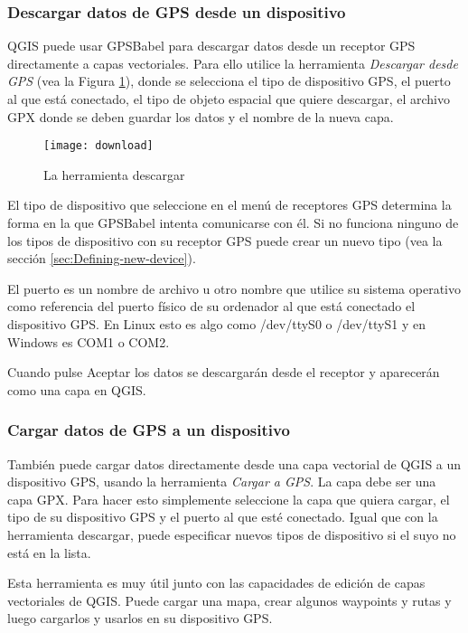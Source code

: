 \subsubsection{Descargar datos de GPS desde un dispositivo}

QGIS puede usar GPSBabel para descargar datos desde un receptor GPS
directamente a capas vectoriales. Para ello utilice la herramienta \emph{Descargar desde GPS} (vea la Figura \ref{figure_download}), donde se selecciona el tipo de dispositivo GPS, el puerto al que está conectado, 
el tipo de objeto espacial que quiere descargar, el archivo GPX donde se deben
guardar los datos y el nombre de la nueva capa.

\begin{figure}[ht]
   \begin{center}
\caption{\label{figure_download}La herramienta descargar}
\texttt{[image: download]}
   \end{center}
\end{figure}


El tipo de dispositivo que seleccione en el menú de receptores GPS determina la forma en la que GPSBabel
intenta comunicarse con él. Si no funciona ninguno de los tipos de dispositivo con su receptor GPS puede crear un nuevo tipo (vea la sección
\ref{sec:Defining-new-device}).

El puerto es un nombre de archivo u otro nombre que utilice su sistema operativo
como referencia del puerto físico de su ordenador al que
está conectado el dispositivo GPS. En Linux esto es algo como /dev/ttyS0
o /dev/ttyS1 y en Windows es COM1 o COM2.

Cuando pulse Aceptar los datos se descargarán desde el receptor y aparecerán como una capa en QGIS.

\subsubsection{Cargar datos de GPS a un dispositivo}

También puede cargar datos directamente desde una capa vectorial de QGIS a
un dispositivo GPS, usando la herramienta \emph{Cargar a GPS}. La capa debe ser una capa GPX.
Para hacer esto simplemente seleccione la capa que quiera cargar, el tipo de su
dispositivo GPS y el puerto al que esté conectado. Igual que con la herramienta descargar, 
puede especificar nuevos tipos de dispositivo si el suyo no está en la lista.

Esta herramienta es muy útil junto con las capacidades de edición de capas 
vectoriales de QGIS. Puede cargar una mapa, crear algunos waypoints y rutas y
luego cargarlos y usarlos en su dispositivo GPS.

